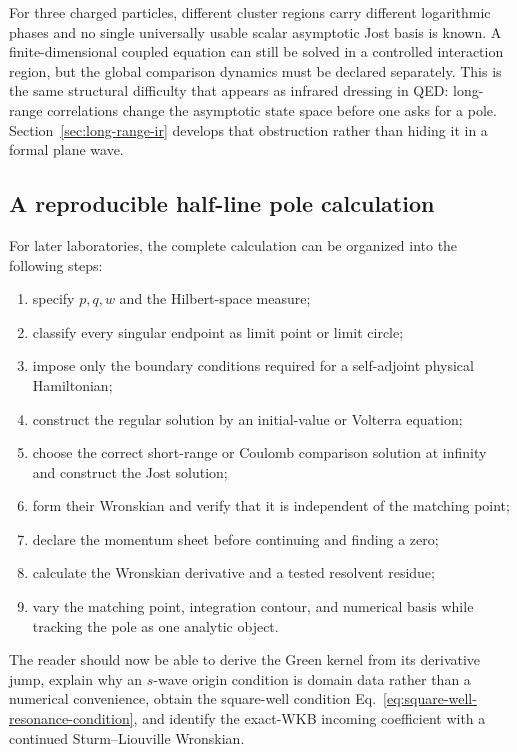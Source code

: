 For three charged particles, different cluster regions carry different
logarithmic phases and no single universally usable scalar asymptotic Jost
basis is known.  A finite-dimensional coupled equation can still be solved in
a controlled interaction region, but the global comparison dynamics must be
declared separately.  This is the same structural difficulty that appears as
infrared dressing in QED: long-range correlations change the asymptotic state
space before one asks for a pole.  Section~\ref{sec:long-range-ir} develops
that obstruction rather than hiding it in a formal plane wave.

\subsection{A reproducible half-line pole calculation}
\label{subsec:sl-jost-algorithm}

For later laboratories, the complete calculation can be organized into the
following steps:
\begin{enumerate}[label=\arabic*.]
  \item specify $p,q,w$ and the Hilbert-space measure;
  \item classify every singular endpoint as limit point or limit circle;
  \item impose only the boundary conditions required for a self-adjoint
  physical Hamiltonian;
  \item construct the regular solution by an initial-value or Volterra
  equation;
  \item choose the correct short-range or Coulomb comparison solution at
  infinity and construct the Jost solution;
  \item form their Wronskian and verify that it is independent of the matching
  point;
  \item declare the momentum sheet before continuing and finding a zero;
  \item calculate the Wronskian derivative and a tested resolvent residue;
  \item vary the matching point, integration contour, and numerical basis
  while tracking the pole as one analytic object.
\end{enumerate}

\begin{checkpointbox}
The reader should now be able to derive the Green kernel from its derivative
jump, explain why an $s$-wave origin condition is domain data rather than a
numerical convenience, obtain the square-well condition
Eq.~\eqref{eq:square-well-resonance-condition}, and identify the exact-WKB
incoming coefficient with a continued Sturm--Liouville Wronskian.
\end{checkpointbox}
